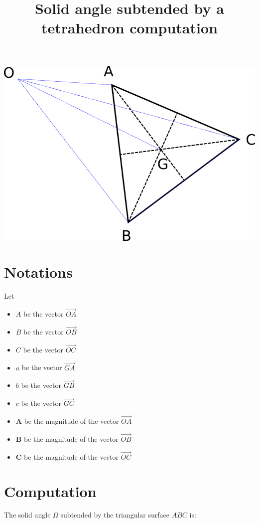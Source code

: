 \documentclass[10pt,a4paper]{article}
\title{Solid angle subtended by a tetrahedron computation}
\begin{document}
\maketitle


\includegraphics[scale=0.4]{tetra.png} 


\section{Notations}

Let

\begin{itemize}
	\item $A$ be the vector $\vec{OA}$
	\item $B$ be the vector $\vec{OB}$
	\item $C$ be the vector $\vec{OC}$
	\item $a$ be the vector $\vec{GA}$
	\item $b$ be the vector $\vec{GB}$
	\item $c$ be the vector $\vec{GC}$
	\item $\mathbf{A}$ be the magnitude of the vector $\vec{OA}$
	\item $\mathbf{B}$ be the magnitude of the vector $\vec{OB}$
	\item $\mathbf{C}$ be the magnitude of the vector $\vec{OC}$
\end{itemize}

\section{Computation}

The solid angle $\Omega$ subtended by the triangular surface $ABC$ is:
\end{document}

